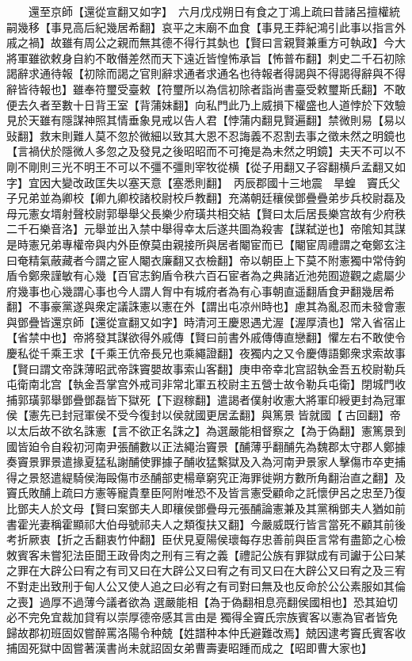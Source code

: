 　　還至京師【還從宣翻又如字】　六月戊戍朔日有食之丁鴻上疏曰昔諸呂擅權統嗣幾移【事見高后紀幾居希翻】哀平之末廟不血食【事見王莽紀鴻引此事以指言外戚之禍】故雖有周公之親而無其德不得行其埶也【賢曰言親賢兼重方可執政】今大將軍雖欲敕身自約不敢僭差然而天下遠近皆惶怖承旨【怖普布翻】刺史二千石初除謁辭求通待報【初除而謁之官則辭求通者求通名也待報者得謁與不得謁得辭與不得辭皆待報也】雖奉符璽受臺敕【符璽所以為信初除者詣尚書臺受敕璽斯氏翻】不敢便去久者至數十日背王室【背蒲妹翻】向私門此乃上威損下權盛也人道悖於下效驗見於天雖有隱謀神照其情垂象見戒以告人君【悖蒲内翻見賢遍翻】禁微則易【易以䜴翻】救末則難人莫不忽於微細以致其大恩不忍誨義不忍割去事之徵未然之明鏡也【言禍伏於隱微人多忽之及發見之後昭昭而不可掩是為未然之明鏡】夫天不可以不剛不剛則三光不明王不可以不彊不彊則宰牧從横【從子用翻又子容翻横戶孟翻又如字】宜因大變改政匡失以塞天意【塞悉則翻】　丙辰郡國十三地震　旱蝗　竇氏父子兄弟並為卿校【卿九卿校諸校尉校戶教翻】充滿朝廷穰侯鄧疊疊弟步兵校尉磊及母元憲女壻射聲校尉郭舉舉父長樂少府璜共相交結【賢曰太后居長樂宫故有少府秩二千石樂音洛】元舉並出入禁中舉得幸太后遂共圖為殺害【謀弑逆也】帝隂知其謀是時憲兄弟專權帝與内外臣僚莫由親接所與居者閹宦而已【閹宦周禮謂之奄鄭玄注曰奄精氣蔽藏者今謂之宦人閹衣廉翻又衣檢翻】帝以朝臣上下莫不附憲獨中常侍鉤盾令鄭衆謹敏有心幾【百官志鉤盾令秩六百石宦者為之典諸近池苑囿遊觀之處屬少府幾事也心幾謂心事也今人謂人胷中有城府者為有心事朝直遥翻盾食尹翻幾居希翻】不事豪黨遂與衆定議誅憲以憲在外【謂出屯凉州時也】慮其為亂忍而未發會憲與鄧疊皆還京師【還從宣翻又如字】時清河王慶恩遇尤渥【渥厚漬也】常入省宿止【省禁中也】帝將發其謀欲得外戚傳【賢曰前書外戚傳傳直戀翻】懼左右不敢使令慶私從千乘王求【千乘王伉帝長兄也乘繩證翻】夜獨内之又令慶傳語鄭衆求索故事【賢曰謂文帝誅薄昭武帝誅竇嬰故事索山客翻】庚申帝幸北宫詔執金吾五校尉勒兵屯衛南北宫【執金吾掌宫外戒司非常北軍五校尉主五營士故令勒兵屯衛】閉城門收捕郭璜郭舉鄧疊鄧磊皆下獄死【下遐稼翻】遣謁者僕射收憲大將軍印綬更封為冠軍侯【憲先已封冠軍侯不受今復封以侯就國更居孟翻】與篤景皆就國【古回翻】帝以太后故不欲名誅憲【言不欲正名誅之】為選嚴能相督察之【為于偽翻】憲篤景到國皆廹令自殺初河南尹張酺數以正法繩治竇景【酺薄乎翻酺先為魏郡太守郡人鄭據奏竇景罪景遣掾夏猛私謝酺使罪據子酺收猛繫獄及入為河南尹景家人擊傷市卒吏捕得之景怒遣緹騎侯海毆傷市丞酺部吏楊章窮究正海罪徙朔方數所角翻治直之翻】及竇氏敗酺上疏曰方憲等寵貴羣臣阿附唯恐不及皆言憲受顧命之託懷伊呂之忠至乃復比鄧夫人於文母【賢曰案鄧夫人即穰侯鄧疊母元張酺論憲兼及其黨稱鄧夫人猶如前書霍光妻稱霍顯祁大伯母號祁夫人之類復扶又翻】今嚴威既行皆言當死不顧其前後考折厥衷【折之舌翻衷竹仲翻】臣伏見夏陽侯瓌每存忠善前與臣言常有盡節之心檢敇賓客未嘗犯法臣聞王政骨肉之刑有三宥之義【禮記公族有罪獄成有司讞于公曰某之罪在大辟公曰宥之有司又曰在大辟公又曰宥之有司又曰在大辟公又曰宥之及三宥不對走出致刑于甸人公又使人追之曰必宥之有司對曰無及也反命於公公素服如其倫之喪】過厚不過薄今議者欲為選嚴能相【為于偽翻相息亮翻侯國相也】恐其廹切必不完免宜裁加貸宥以崇厚德帝感其言由是獨得全竇氏宗族賓客以憲為官者皆免歸故郡初班固奴嘗醉罵洛陽令种兢【姓譜种本仲氏避難改焉】兢因逮考竇氏賓客收捕固死獄中固嘗著漢書尚未就詔固女弟曹壽妻昭踵而成之【昭即曹大家也】

